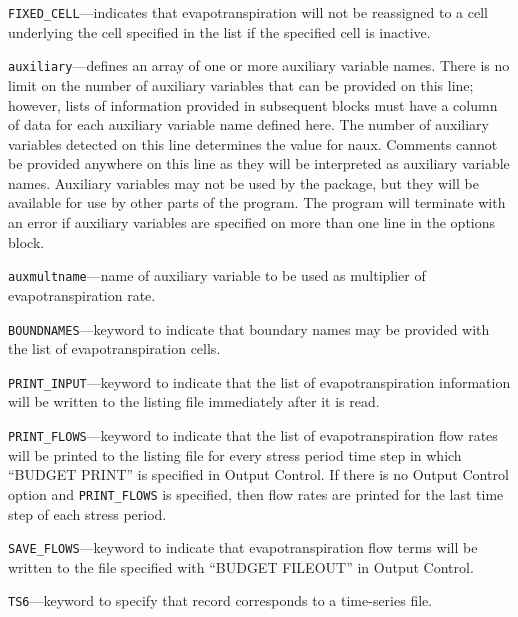 
\item \texttt{FIXED\_CELL}---indicates that evapotranspiration will not be reassigned to a cell underlying the cell specified in the list if the specified cell is inactive.

\item \texttt{auxiliary}---defines an array of one or more auxiliary variable names.  There is no limit on the number of auxiliary variables that can be provided on this line; however, lists of information provided in subsequent blocks must have a column of data for each auxiliary variable name defined here.   The number of auxiliary variables detected on this line determines the value for naux.  Comments cannot be provided anywhere on this line as they will be interpreted as auxiliary variable names.  Auxiliary variables may not be used by the package, but they will be available for use by other parts of the program.  The program will terminate with an error if auxiliary variables are specified on more than one line in the options block.

\item \texttt{auxmultname}---name of auxiliary variable to be used as multiplier of evapotranspiration rate.

\item \texttt{BOUNDNAMES}---keyword to indicate that boundary names may be provided with the list of evapotranspiration cells.

\item \texttt{PRINT\_INPUT}---keyword to indicate that the list of evapotranspiration information will be written to the listing file immediately after it is read.

\item \texttt{PRINT\_FLOWS}---keyword to indicate that the list of evapotranspiration flow rates will be printed to the listing file for every stress period time step in which ``BUDGET PRINT'' is specified in Output Control.  If there is no Output Control option and \texttt{PRINT\_FLOWS} is specified, then flow rates are printed for the last time step of each stress period.

\item \texttt{SAVE\_FLOWS}---keyword to indicate that evapotranspiration flow terms will be written to the file specified with ``BUDGET FILEOUT'' in Output Control.

\item \texttt{TS6}---keyword to specify that record corresponds to a time-series file.

